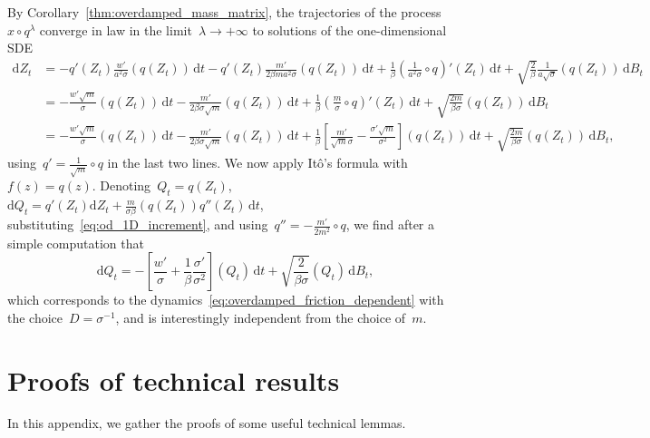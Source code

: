 \documentclass[10pt]{article}
\renewcommand{\d}{\mathrm{d}}
\newcommand{\1}{\mathbbm 1}
\begin{document}
By Corollary~\ref{thm:overdamped_mass_matrix}, the trajectories of the process~$x \circ q^\lambda$ converge in law in the limit~$\lambda\to +\infty$ to solutions of the one-dimensional SDE
\begin{equation}
    \begin{aligned}
        \label{eq:od_1D_increment}
        \d Z_t &= -q'(Z_t)\frac{w'}{a^2\sigma} (q (Z_t))\,\d t - q'(Z_t)\frac{m'}{2\beta m a^2\sigma}(q(Z_t))\,\d t + \frac{1}{\beta}\left(\frac{1}{a^2\sigma}\circ q\right)'(Z_t)\,\d t + \sqrt{\frac{2}{\beta}}\frac{1}{a\sqrt{\sigma}}(q(Z_t))\,\d B_t\\
        & = -\frac{w'\sqrt{m}}{\sigma} (q (Z_t))\,\d t - \frac{m'}{2\beta\sigma\sqrt{m}}(q(Z_t))\,\d t + \frac{1}{\beta}\left(\frac{m}{\sigma}\circ q\right)'(Z_t)\,\d t + \sqrt{\frac{2 m}{\beta \sigma}}(q(Z_t))\,\d B_t\\
        &=-\frac{w'\sqrt{m}}{\sigma} (q (Z_t))\,\d t - \frac{m'}{2\beta\sigma\sqrt{m}}(q(Z_t))\,\d t + \frac{1}{\beta}\left[\frac{m'}{\sqrt{m}\sigma}-\frac{\sigma'\sqrt{m}}{\sigma^2}\right](q(Z_t))\,\d t +  \sqrt{\frac{2 m}{\beta \sigma}}(q(Z_t))\,\d B_t,
    \end{aligned}
\end{equation}
using~$q' = \frac1{\sqrt{m}}\circ q$ in the last two lines. We now apply It\^o's formula with~$f(z)=q(z)$.
Denoting~$Q_t = q(Z_t)$,~$\d Q_t = q'(Z_t)\d Z_t + \frac{m}{\sigma\beta}(q(Z_t)) q''(Z_t)\,\d t$, substituting~\eqref{eq:od_1D_increment}, and using~${q'' = -\frac{m'}{2m^2}\circ q}$, we find after a simple computation that
\begin{equation}
    \d Q_t = - \left[\frac{w'}{\sigma} +\frac1\beta\frac{\sigma'}{\sigma^2}\right](Q_t)\,\d t + \sqrt{\frac{2}{\beta \sigma}}(Q_t)\,\d B_t,
\end{equation}
which corresponds to the dynamics~\eqref{eq:overdamped_friction_dependent} with the choice~$D=\sigma^{-1}$, and is interestingly independent from the choice of~$m$.

\appendix
\section{Proofs of technical results}
\label{sec:proofs}
In this appendix, we gather the proofs of some useful technical lemmas.
\end{document}
